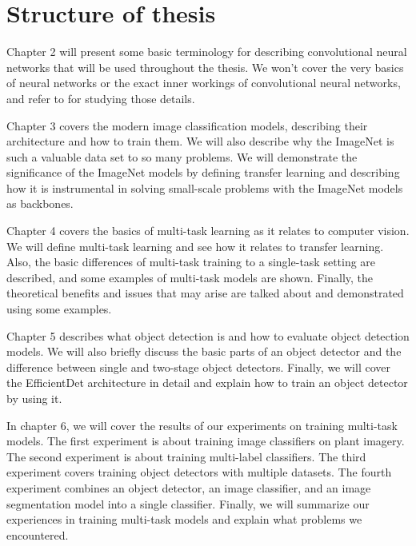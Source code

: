 \section{Structure of thesis}
Chapter 2 will present some basic terminology for describing convolutional neural networks that will be used throughout the thesis.
We won't cover the very basics of neural networks or the exact inner workings of convolutional neural networks, and refer to \citep{deep-learning} for studying those details.

Chapter 3 covers the modern image classification models, describing their architecture and how to train them.
We will also describe why the ImageNet is such a valuable data set to so many problems.
We will demonstrate the significance of the ImageNet models by defining transfer learning and describing how it is instrumental in solving small-scale problems with the ImageNet models as backbones.

Chapter 4 covers the basics of multi-task learning as it relates to computer vision.
We will define multi-task learning and see how it relates to transfer learning.
Also, the basic differences of multi-task training to a single-task setting are described, and some examples of multi-task models are shown.
Finally, the theoretical benefits and issues that may arise are talked about and demonstrated using some examples.

Chapter 5 describes what object detection is and how to evaluate object detection models.
We will also briefly discuss the basic parts of an object detector and the difference between single and two-stage object detectors.
Finally, we will cover the EfficientDet architecture in detail and explain how to train an object detector by using it.

In chapter 6, we will cover the results of our experiments on training multi-task models.
The first experiment is about training image classifiers on plant imagery.
The second experiment is about training multi-label classifiers.
The third experiment covers training object detectors with multiple datasets.
The fourth experiment combines an object detector, an image classifier, and an image segmentation model into a single classifier.
Finally, we will summarize our experiences in training multi-task models and explain what problems we encountered.

